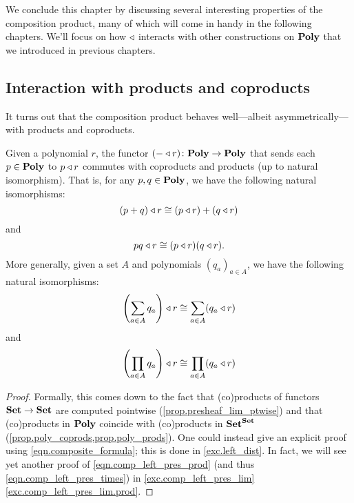 \documentclass[Book-Poly]{subfiles}
\begin{document}
We conclude this chapter by discussing several interesting properties of the composition product, many of which will come in handy in the following chapters.
We'll focus on how $\mathbin{\triangleleft}$ interacts with other constructions on $\mathbf{Poly}$ that we introduced in previous chapters.

\subsection{Interaction with products and coproducts} \label{subsec.comon.comp.prop.prod}

It turns out that the composition product behaves well---albeit asymmetrically---with products and coproducts.

\begin{proposition}\label{prop.left_dist_prod}
Given a polynomial $r$, the functor $(-\mathbin{\triangleleft} r)\colon\mathbf{Poly}\to\mathbf{Poly}$ that sends each $p\in\mathbf{Poly}$ to $p\mathbin{\triangleleft} r$ commutes with coproducts and products (up to natural isomorphism).
That is, for any $p,q\in\mathbf{Poly}$, we have the following natural isomorphisms:
\begin{equation}\label{eqn.comp_left_pres_plus}
    (p+q)\mathbin{\triangleleft} r\cong (p\mathbin{\triangleleft} r)+(q\mathbin{\triangleleft} r)
\end{equation}
and
\begin{equation}\label{eqn.comp_left_pres_times}
    pq\mathbin{\triangleleft} r\cong (p\mathbin{\triangleleft} r)(q\mathbin{\triangleleft} r).
\end{equation}
More generally, given a set $A$ and polynomials $(q_a)_{a\in A}$, we have the following natural isomorphisms:
\begin{equation}\label{eqn.comp_left_pres_sum}
    \left(\sum_{a\in A}q_a\right)\mathbin{\triangleleft} r\cong \sum_{a\in A} (q_a\mathbin{\triangleleft} r)
\end{equation}
and
\begin{equation}\label{eqn.comp_left_pres_prod}
    \left(\prod_{a\in A}q_a\right)\mathbin{\triangleleft} r\cong \prod_{a\in A} (q_a\mathbin{\triangleleft} r)
\end{equation}
\end{proposition} 
\begin{proof}
Formally, this comes down to the fact that (co)products of functors $\mathbf{Set}\to\mathbf{Set}$ are computed pointwise (\cref{prop.presheaf_lim_ptwise}) and that (co)products in $\mathbf{Poly}$ coincide with (co)products in $\mathbf{Set}^{\mathbf{Set}}$ (\cref{prop.poly_coprods,prop.poly_prods}).
One could instead give an explicit proof using \eqref{eqn.composite_formula}; this is done in \cref{exc.left_dist}.
In fact, we will see yet another proof of \eqref{eqn.comp_left_pres_prod} (and thus \eqref{eqn.comp_left_pres_times}) in \cref{exc.comp_left_pres_lim} \cref{exc.comp_left_pres_lim.prod}.
\end{proof}
\end{document}
